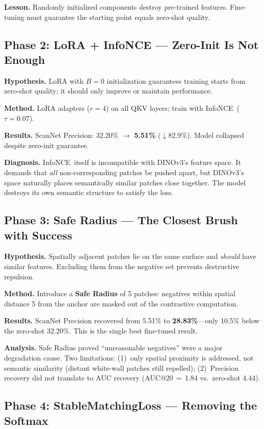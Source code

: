 \documentclass[11pt,a4paper]{article}
\newcommand{\infonce}{InfoNCE\ }
\begin{document}
\textbf{Lesson.} Randomly initialized components destroy pre-trained features. Fine-tuning must guarantee the starting point equals zero-shot quality.

\subsection{Phase 2: LoRA + InfoNCE --- Zero-Init Is Not Enough}

\textbf{Hypothesis.} LoRA with $B=0$ initialization guarantees training starts from zero-shot quality; it should only improve or maintain performance.

\textbf{Method.} LoRA adapters ($r=4$) on all QKV layers; train with \infonce ($\tau=0.07$).

\textbf{Results.} ScanNet Precision: 32.20\% $\rightarrow$ \textbf{5.51\%} ($\downarrow$82.9\%). Model collapsed despite zero-init guarantee.

\textbf{Diagnosis.} \infonce itself is incompatible with DINOv3's feature space. It demands that \emph{all} non-corresponding patches be pushed apart, but DINOv3's space naturally places semantically similar patches close together. The model destroys its own semantic structure to satisfy the loss.

\subsection{Phase 3: Safe Radius --- The Closest Brush with Success}

\textbf{Hypothesis.} Spatially adjacent patches lie on the same surface and \emph{should} have similar features. Excluding them from the negative set prevents destructive repulsion.

\textbf{Method.} Introduce a \textbf{Safe Radius} of 5 patches: negatives within spatial distance 5 from the anchor are masked out of the contrastive computation.

\textbf{Results.} ScanNet Precision recovered from 5.51\% to \textbf{28.83\%}---only 10.5\% below the zero-shot 32.20\%. This is the single best fine-tuned result.

\textbf{Analysis.} Safe Radius proved ``unreasonable negatives'' were a major degradation cause. Two limitations: (1)~only spatial proximity is addressed, not semantic similarity (distant white-wall patches still repelled); (2)~Precision recovery did not translate to AUC recovery (AUC@20\,$=$\,1.84 vs.\ zero-shot 4.44).

\subsection{Phase 4: StableMatchingLoss --- Removing the Softmax}
\end{document}
